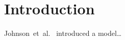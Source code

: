\documentclass{article}
\begin{document}
{
    \section{Introduction}
    \label{sec:introduction}

    Johnson~et~al.~\cite{https://doi.org/10.48550/arxiv.1603.08155} introduced a model…






}
\end{document}
